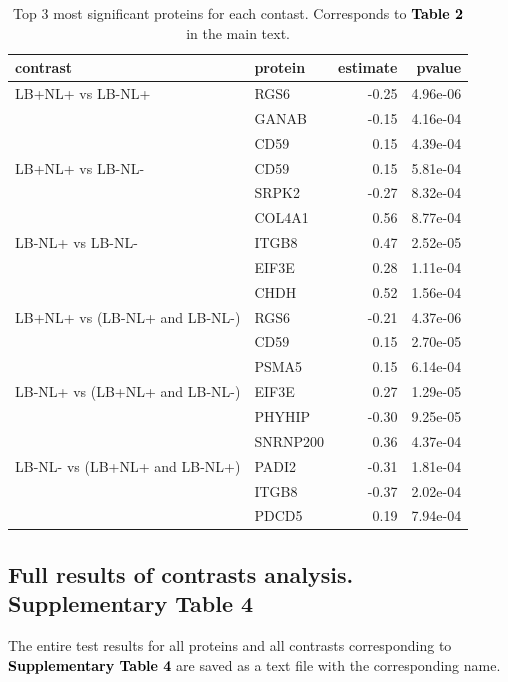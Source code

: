 \documentclass[11pt]{article}\usepackage[]{graphicx}\usepackage[usenames,dvipsnames]{color}
\begin{document}
{\centering
\begin{table}[ht]
\centering
\begin{tabular}{llrr}
  \toprule
{\bfseries  contrast } & {\bfseries  protein } & {\bfseries  estimate } & {\bfseries  pvalue } \\ 
  \midrule
LB+NL+ vs LB-NL+ & RGS6 & -0.25 & 4.96e-06 \\ 
   & GANAB & -0.15 & 4.16e-04 \\ 
   & CD59 & 0.15 & 4.39e-04 \\ 
   \midrule
LB+NL+ vs LB-NL- & CD59 & 0.15 & 5.81e-04 \\ 
   & SRPK2 & -0.27 & 8.32e-04 \\ 
   & COL4A1 & 0.56 & 8.77e-04 \\ 
   \midrule
LB-NL+ vs LB-NL- & ITGB8 & 0.47 & 2.52e-05 \\ 
   & EIF3E & 0.28 & 1.11e-04 \\ 
   & CHDH & 0.52 & 1.56e-04 \\ 
   \midrule
LB+NL+ vs (LB-NL+ and LB-NL-) & RGS6 & -0.21 & 4.37e-06 \\ 
   & CD59 & 0.15 & 2.70e-05 \\ 
   & PSMA5 & 0.15 & 6.14e-04 \\ 
   \midrule
LB-NL+ vs (LB+NL+ and LB-NL-) & EIF3E & 0.27 & 1.29e-05 \\ 
   & PHYHIP & -0.30 & 9.25e-05 \\ 
   & SNRNP200 & 0.36 & 4.37e-04 \\ 
   \midrule
LB-NL- vs (LB+NL+ and LB-NL+) & PADI2 & -0.31 & 1.81e-04 \\ 
   & ITGB8 & -0.37 & 2.02e-04 \\ 
   & PDCD5 & 0.19 & 7.94e-04 \\ 
   \bottomrule
\end{tabular}
\caption{{\color{darkgray} Top 3 most significant proteins 
for each contast. Corresponds to 
\textcolor{black}{\colorbox{highlighter}{\textbf{Table 2}}} in the main text.}} 
\end{table}

}


\subsection{Full results of contrasts analysis. Supplementary Table 4}
The entire test results for all proteins and all contrasts corresponding to
\textcolor{black}{\colorbox{highlighter}{\textbf{Supplementary Table 4}}}
are saved as a text file with the corresponding name.
\end{document}
